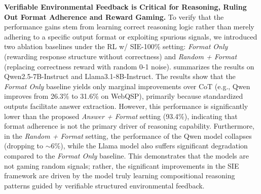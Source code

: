 \documentclass{article} %
\begin{document}
\begin{table}[!t]
\vspace{-5pt}
\centering
\caption{Comparison of performance improvement in structured, mathematical, and logical reasoning tasks after RL fine-tuning of Qwen2.5-7B-Instruct from different starting checkpoints. The best results are highlighted in \textbf{bold}. Compared to RL w/ SIE, RL w/ SIE f/ SFT achieves better generalization in math and logic reasoning, but its improvement in structured reasoning is limited.}
\vspace{-5pt}
\label{tab:method_comparison}
\vspace{-10pt}
\end{table}


\textbf{Verifiable Environmental Feedback is Critical for Reasoning, Ruling Out Format Adherence and Reward Gaming.}
To verify that the performance gains stem from learning correct reasoning logic rather than merely adhering to a specific output format or exploiting spurious signals, we introduced two ablation baselines under the RL w/ SIE-100\% setting: \textit{Format Only} (rewarding response structure without correctness) and \textit{Random + Format} (replacing correctness reward with random 0-1 noise).
 summarizes the results on Qwen2.5-7B-Instruct and Llama3.1-8B-Instruct.
The results show that the \textit{Format Only} baseline yields only marginal improvements over CoT (e.g., Qwen improves from 26.3\% to 31.6\% on WebQSP), primarily because standardized outputs facilitate answer extraction. However, this performance is significantly lower than the proposed \textit{Answer + Format} setting (93.4\%), indicating that format adherence is not the primary driver of reasoning capability.
Furthermore, in the \textit{Random + Format} setting, the performance of the Qwen model collapses (dropping to $\sim$6\%), while the Llama model also suffers significant degradation compared to the \textit{Format Only} baseline.
This demonstrates that the models are not gaming random signals; rather, the significant improvements in the SIE framework are driven by the model truly learning compositional reasoning patterns guided by verifiable structured environmental feedback.
\end{document}
